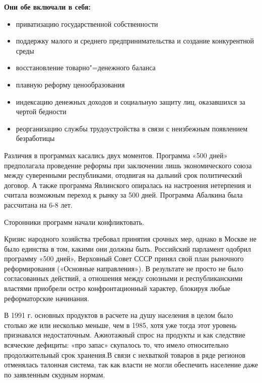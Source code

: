  \textbf{Они обе включали в себя:}

\begin{itemize}
    \item приватизацию государственной собственности
    \item поддержку малого и среднего предпринимательства и создание конкурентной среды
    \item восстановление товарно"=денежного баланса
    \item плавную реформу ценообразования
    \item индексацию денежных доходов и социальную защиту лиц, оказавшихся за чертой бедности
    \item реорганизацию службы трудоустройства в связи с неизбежным появлением безработицы
\end{itemize}

Различия в программах касались двух моментов. Программа «500 дней» предполагала проведение реформы при заключении лишь экономического союза между суверенными республиками, отодвигая на дальний срок политический договор. А также программа Явлинского опиралась на настроения нетерпения и считала возможным переход к рынку за 500 дней. Программа Абалкина была рассчитана на 6-8 лет.

Сторонники программ начали конфликтовать.

Кризис народного хозяйства требовал принятия срочных мер, однако в Москве не было единства в том, какими они должны быть. Российский парламент одобрил программу «500 дней», Верховный Совет СССР принял свой план рыночного реформирования («Основные направления»). В результате не просто не было согласованных действий, а отношения между союзными и республиканскими властями приобрели остро конфронтационный характер, блокируя любые реформаторские начинания. 

В 1991 г. основных продуктов в расчете на душу населения в целом было столько же или несколько меньше, чем в 1985, хотя уже тогда этот уровень признавался недостаточным. Ажиотажный спрос на продукты и как следствие всяческие дефициты: «про запас» скупалось то, что имело относительно продолжительный срок хранения.В связи с нехваткой товаров в ряде регионов отменялась талонная система, так как власти не могли обеспечить население даже по заявленным скудным нормам.